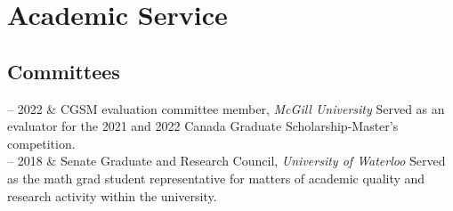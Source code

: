 \documentclass[11pt, a4paper]{article}
\newcommand{\Duration}[2]{\fontsize{10pt}{0}\selectfont #1 -- #2}
\newcommand{\Ongoing}{present}
\begin{document}
\section{Academic Service}
%
%
%
%

\subsection{Committees}

\begin{EntriesTable}
\Duration{2021}{2022} &
  CGSM evaluation committee member, \emph{McGill University}\newline
  Served as an evaluator for the 2021 and 2022 Canada Graduate Scholarship-Master’s competition.
  \\
  
\Duration{2017}{2018} &
  Senate Graduate and Research Council, \emph{University of Waterloo}\newline
  Served as the math grad student representative for matters of academic quality and research activity within the university.
\end{EntriesTable}
\end{document}
